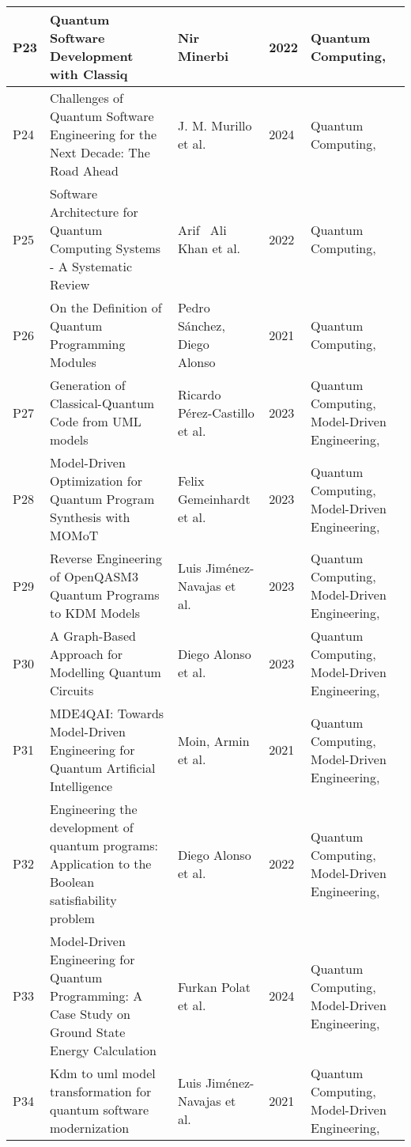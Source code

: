 \begin{longtable}{|m{0.8cm}|m{4.4cm}|m{3cm}|m{0.8cm}|m{4cm}|}
    P23 & Quantum Software Development with Classiq & Nir Minerbi~\cite{minerbi2022quantum} & 2022 & Quantum Computing,  \\ \hline
    P24 & Challenges of Quantum Software Engineering for the Next Decade: The Road Ahead & J. M. Murillo et al.~\cite{murillo2024challenges} & 2024 & Quantum Computing,  \\ \hline
    P25 & Software Architecture for Quantum Computing Systems - A Systematic Review & Arif  Ali Khan et al.~\cite{Khan_2022} & 2022 & Quantum Computing,  \\ \hline
    P26 & On the Definition of Quantum Programming Modules & Pedro Sánchez, Diego Alonso~\cite{Sanchez_2021} & 2021 & Quantum Computing,  \\ \hline
    P27 & Generation of Classical-Quantum Code from UML models & Ricardo Pérez-Castillo et al.~\cite{Perez-Castillo_2023} & 2023 & Quantum Computing, Model-Driven Engineering,  \\ \hline
    P28 & Model-Driven Optimization for Quantum Program Synthesis with MOMoT & Felix Gemeinhardt et al.~\cite{Gemeinhardt_2023} & 2023 & Quantum Computing, Model-Driven Engineering,  \\ \hline
    P29 & Reverse Engineering of OpenQASM3 Quantum Programs to KDM Models & Luis Jiménez-Navajas et al.~\cite{Jimenez-Navajas_2023} & 2023 & Quantum Computing, Model-Driven Engineering,  \\ \hline
    P30 & A Graph-Based Approach for Modelling Quantum Circuits & Diego Alonso et al.~\cite{alonso2023graph} & 2023 & Quantum Computing, Model-Driven Engineering,  \\ \hline
    P31 & MDE4QAI: Towards Model-Driven Engineering for Quantum Artificial Intelligence & Moin, Armin et al.~\cite{Moin_2021} & 2021 & Quantum Computing, Model-Driven Engineering,  \\ \hline
    P32 & Engineering the development of quantum programs: Application to the Boolean satisfiability problem & Diego Alonso et al.~\cite{Alonso_2022} & 2022 & Quantum Computing, Model-Driven Engineering,  \\ \hline
    P33 & Model-Driven Engineering for Quantum Programming: A Case Study on Ground State Energy Calculation & Furkan Polat et al.~\cite{polat2024model} & 2024 & Quantum Computing, Model-Driven Engineering,  \\ \hline
    P34 & Kdm to uml model transformation for quantum software modernization & Luis Jiménez-Navajas et al.~\cite{Jimenez-Navajas_2021} & 2021 & Quantum Computing, Model-Driven Engineering,  \\ \hline

\end{longtable}
